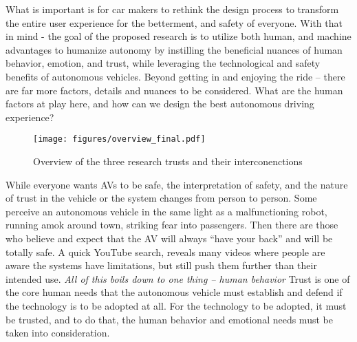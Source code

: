 What is important is for car makers to rethink the design process to transform the entire user experience for the betterment, and safety of everyone. 
With that in mind - the goal of the proposed research is to utilize both human, and machine advantages to humanize autonomy by instilling the beneficial nuances of human behavior, emotion, and trust, while leveraging the technological and safety benefits of autonomous vehicles.
Beyond getting in and enjoying the ride – there are far more factors, details and nuances to be considered. 
What are the human factors at play here, and how can we design the best autonomous driving experience?

\begin{figure}
    \centering
    \texttt{[image: figures/overview\_final.pdf]}
    \caption{Overview of the three research trusts and their interconenctions}
    \label{fig:overview}
\end{figure}



While everyone wants AVs to be safe, the interpretation of safety, and the nature of trust in the vehicle or the system changes from person to person.
Some perceive an autonomous vehicle in the same light as a malfunctioning robot, running amok around town, striking fear into passengers.
Then there are those who believe and expect that the AV will always ``have your back'' and will be totally safe.
A quick YouTube search, reveals many videos where people are aware the systems have limitations, but still push them further than their intended use. %
\textit{All of this boils down to one thing – human behavior}
Trust is one of the core human needs that the autonomous vehicle must establish and defend if the technology is to be adopted at all.
For the technology to be adopted, it must be trusted, and to do that, the human behavior and emotional needs must be taken into consideration. 



